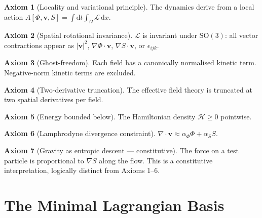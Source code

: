 \documentclass[12pt, oneside]{book}
\theoremstyle{plain}
\theoremstyle{definition}
\newtheorem{axiom}{Axiom}[chapter]
\newcommand{\vfield}{\mathbf{v}}
\newcommand{\dd}{\mathrm{d}}
\newcommand{\nab}{\nabla}
\begin{document}
\begin{axiom}[Locality and variational principle]
The dynamics derive from a local action
$A[\Phi,\vfield,S] = \int\dd t\int_\Omega \mathcal{L}\, \dd x$.
\end{axiom}

\begin{axiom}[Spatial rotational invariance]
$\mathcal{L}$ is invariant under $\mathrm{SO}(3)$: all vector contractions appear
as $|\vfield|^2$, $\nab\Phi\cdot\vfield$, $\nab S\cdot\vfield$, or $\epsilon_{ijk}$.
\end{axiom}

\begin{axiom}[Ghost-freedom]
Each field has a canonically normalised kinetic term. Negative-norm kinetic terms
are excluded.
\end{axiom}

\begin{axiom}[Two-derivative truncation]
The effective field theory is truncated at two spatial derivatives per field.
\end{axiom}

\begin{axiom}[Energy bounded below]
The Hamiltonian density $\mathcal{H} \geq 0$ pointwise.
\end{axiom}

\begin{axiom}[Lamphrodyne divergence constraint]
$\nab\cdot\vfield \approx \alpha_\Phi\Phi + \alpha_S S$.
\label{ax:div}
\end{axiom}

\begin{axiom}[Gravity as entropic descent --- constitutive]
The force on a test particle is proportional to $\nab S$ along the flow.
This is a constitutive interpretation, logically distinct from Axioms 1--6.
\end{axiom}

\section{The Minimal Lagrangian Basis}
\label{sec:lagrangian}
\end{document}
